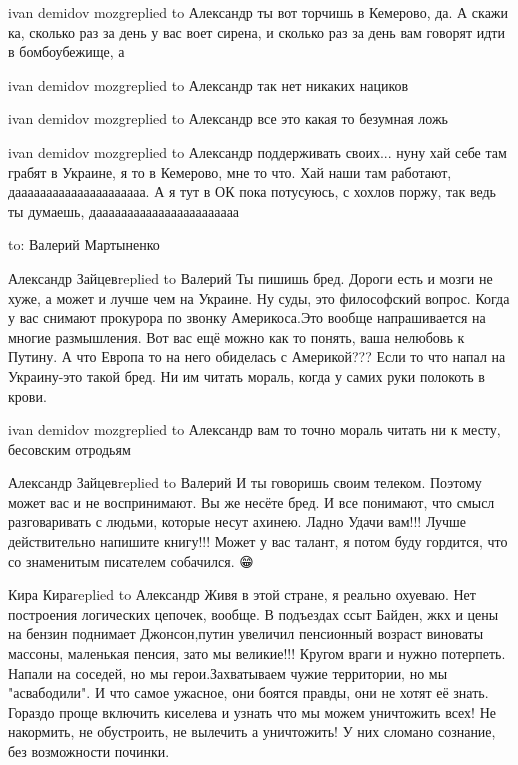 ivan demidov mozgreplied to Александр
ты вот торчишь в Кемерово, да. А скажи ка, сколько раз за день у вас воет сирена, и сколько раз за день вам говорят идти в бомбоубежище, а

ivan demidov mozgreplied to Александр
так нет никаких нациков

ivan demidov mozgreplied to Александр
все это какая то безумная ложь

ivan demidov mozgreplied to Александр
поддерживать своих... нуну хай себе там грабят в Украине, я то в Кемерово, мне то что. Хай наши там работают, дааааааааааааааааааааа. А я тут в ОК пока потусуюсь, с хохлов поржу, так ведь ты думаешь, дааааааааааааааааааааааа

to: Валерий Мартыненко

Александр Зайцевreplied to Валерий
Ты пишишь бред. Дороги есть и мозги не хуже, а может и лучше чем на Украине. Ну суды, это философский вопрос. Когда у вас снимают прокурора по звонку Америкоса.Это вообще напрашивается на многие размышления. Вот вас ещё можно как то понять, ваша нелюбовь к Путину. А что Европа то на него обиделась с Америкой??? Если то что напал на Украину-это такой бред. Ни им читать мораль, когда у самих руки полокоть в крови.

ivan demidov mozgreplied to Александр
вам то точно мораль читать ни к месту, бесовским отродьям

Александр Зайцевreplied to Валерий
И ты говоришь своим телеком. Поэтому может вас и не воспринимают. Вы же несёте бред. И все понимают, что смысл разговаривать с людьми, которые несут ахинею. Ладно Удачи вам!!! Лучше действительно напишите книгу!!! Может у вас талант, я потом буду гордится, что со знаменитым писателем собачился. 😁


Кира Кираreplied to Александр
Живя в этой стране, я реально охуеваю. Нет построения логических цепочек, вообще. В подъездах ссыт Байден, жкх и цены на бензин поднимает Джонсон,путин увеличил пенсионный возраст виноваты массоны, маленькая пенсия, зато мы великие!!! Кругом враги и нужно потерпеть. Напали на соседей, но мы герои.Захватываем чужие территории, но мы "асвабодили". И что самое ужасное, они боятся правды, они не хотят её знать. Гораздо проще включить киселева и узнать что мы можем уничтожить всех! Не накормить, не обустроить, не вылечить а уничтожить! У них сломано сознание, без возможности починки.

